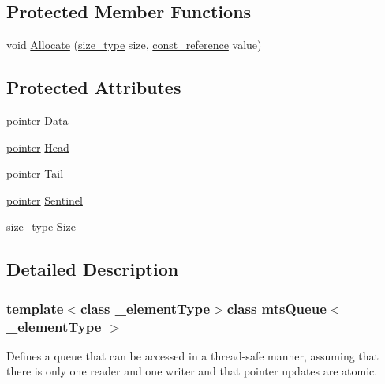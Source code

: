 \subsection*{Protected Member Functions}
\begin{DoxyCompactItemize}
\item 
void \hyperlink{classmts_queue_a70acf931defef26481f1065cfd2f7e01}{Allocate} (\hyperlink{classmts_queue_a41b33537b89ae654421ba5e7c9893ed2}{size\-\_\-type} size, \hyperlink{classmts_queue_a3ae67f8b6cdb9686e5fca9ed1740290e}{const\-\_\-reference} value)
\end{DoxyCompactItemize}
\subsection*{Protected Attributes}
\begin{DoxyCompactItemize}
\item 
\hyperlink{classmts_queue_a66d423ede5c12e015a4e070e1bc23f43}{pointer} \hyperlink{classmts_queue_a7967ce45474f4266531201ec0ff65480}{Data}
\item 
\hyperlink{classmts_queue_a66d423ede5c12e015a4e070e1bc23f43}{pointer} \hyperlink{classmts_queue_a9d7bee24b9b1e45e318dee474d66f12c}{Head}
\item 
\hyperlink{classmts_queue_a66d423ede5c12e015a4e070e1bc23f43}{pointer} \hyperlink{classmts_queue_a3fc27909e8863597f5cc79288f555a9d}{Tail}
\item 
\hyperlink{classmts_queue_a66d423ede5c12e015a4e070e1bc23f43}{pointer} \hyperlink{classmts_queue_aa80fac3217d8148da5383e6fe9ac0fa4}{Sentinel}
\item 
\hyperlink{classmts_queue_a41b33537b89ae654421ba5e7c9893ed2}{size\-\_\-type} \hyperlink{classmts_queue_ac479b4223b71cdc7f9b49325e91ab6c6}{Size}
\end{DoxyCompactItemize}


\subsection{Detailed Description}
\subsubsection*{template$<$class \-\_\-element\-Type$>$class mts\-Queue$<$ \-\_\-element\-Type $>$}

Defines a queue that can be accessed in a thread-\/safe manner, assuming that there is only one reader and one writer and that pointer updates are atomic. 

